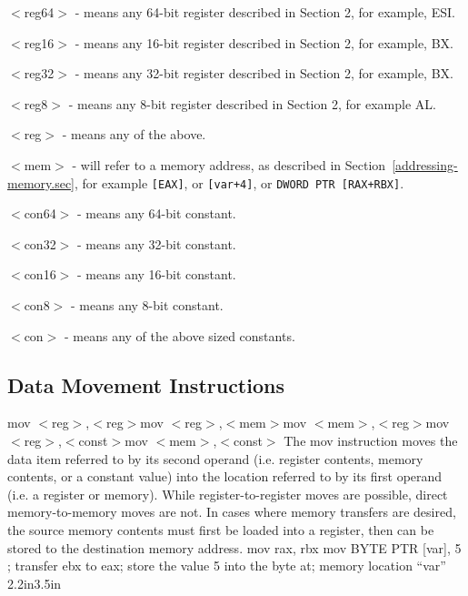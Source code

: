 \begin{itemlist}
\item $<$reg64$>$ - means any 64-bit register described in Section 2, for example, ESI.
\item $<$reg16$>$ - means any 16-bit register described in Section 2, for example, BX.
\item $<$reg32$>$ - means any 32-bit register described in Section 2, for example, BX.
\item $<$reg8$>$ - means any 8-bit register described in Section 2, for example AL.
\item $<$reg$>$ - means any of the above.
\item $<$mem$>$ - will refer to a memory address, as described in Section~\ref{addressing-memory.sec}, for example {\tt [EAX]}, or
{\tt [var+4]}, or {\tt DWORD PTR [RAX+RBX]}.
\item $<$con64$>$ - means any 64-bit constant.
\item $<$con32$>$ - means any 32-bit constant.
\item $<$con16$>$ - means any 16-bit constant.
\item $<$con8$>$ - means any 8-bit constant.
\item $<$con$>$ - means any of the above sized constants.
\end{itemlist}

\subsection{Data Movement Instructions}
\label{data-movement-instructions.sec}

{mov $<$reg$>$,$<$reg$>$\newline mov $<$reg$>$,$<$mem$>$\newline mov $<$mem$>$,$<$reg$>$\newline mov $<$reg$>$,$<$const$>$\newline mov $<$mem$>$,$<$const$>$}
{The mov instruction moves the data item referred to by its second
  operand (i.e.  register contents, memory contents, or a constant
  value) into the location referred to by its first operand (i.e. a
  register or memory). While register-to-register moves are possible,
  direct memory-to-memory moves are not. In cases where memory
  transfers are desired, the source memory contents must first be
  loaded into a register, then can be stored to the destination memory
  address.}
{mov rax, rbx \linebreak mov BYTE PTR [var], 5 }
{; transfer ebx to eax\linebreak; store the value 5 into the byte at\linebreak; memory location ``var''}
{2.2in}{3.5in}

